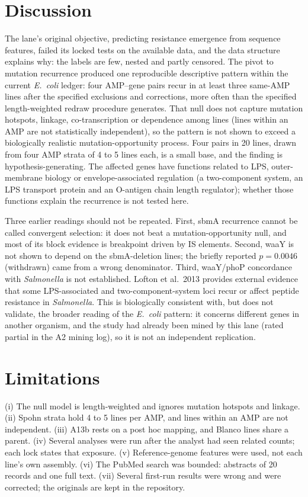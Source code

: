\documentclass[11pt,letterpaper]{article}
\begin{document}
\section{Discussion}
The lane's original objective, predicting resistance emergence from sequence features, failed its locked tests on the available data, and the data structure explains why: the labels are few, nested and partly censored. The pivot to mutation recurrence produced one reproducible descriptive pattern within the current \textit{E.\ coli} ledger: four AMP--gene pairs recur in at least three same-AMP lines after the specified exclusions and corrections, more often than the specified length-weighted redraw procedure generates. That null does not capture mutation hotspots, linkage, co-transcription or dependence among lines (lines within an AMP are not statistically independent), so the pattern is not shown to exceed a biologically realistic mutation-opportunity process. Four pairs in 20 lines, drawn from four AMP strata of 4 to 5 lines each, is a small base, and the finding is hypothesis-generating. The affected genes have functions related to LPS, outer-membrane biology or envelope-associated regulation (a two-component system, an LPS transport protein and an O-antigen chain length regulator); whether those functions explain the recurrence is not tested here.

Three earlier readings should not be repeated. First, sbmA recurrence cannot be called convergent selection: it does not beat a mutation-opportunity null, and most of its block evidence is breakpoint driven by IS elements. Second, waaY is not shown to depend on the sbmA-deletion lines; the briefly reported $p=0.0046$ (withdrawn) came from a wrong denominator. Third, waaY/phoP concordance with \textit{Salmonella} is not established. Lofton et al.\ 2013 provides external evidence that some LPS-associated and two-component-system loci recur or affect peptide resistance in \textit{Salmonella}. This is biologically consistent with, but does not validate, the broader reading of the \textit{E.\ coli} pattern: it concerns different genes in another organism, and the study had already been mined by this lane (rated partial in the A2 mining log), so it is not an independent replication.

\section{Limitations}
(i) The null model is length-weighted and ignores mutation hotspots and linkage. (ii) Spohn strata hold 4 to 5 lines per AMP, and lines within an AMP are not independent. (iii) A13b rests on a post hoc mapping, and Blanco lines share a parent. (iv) Several analyses were run after the analyst had seen related counts; each lock states that exposure. (v) Reference-genome features were used, not each line's own assembly. (vi) The PubMed search was bounded: abstracts of 20 records and one full text. (vii) Several first-run results were wrong and were corrected; the originals are kept in the repository.
\end{document}
